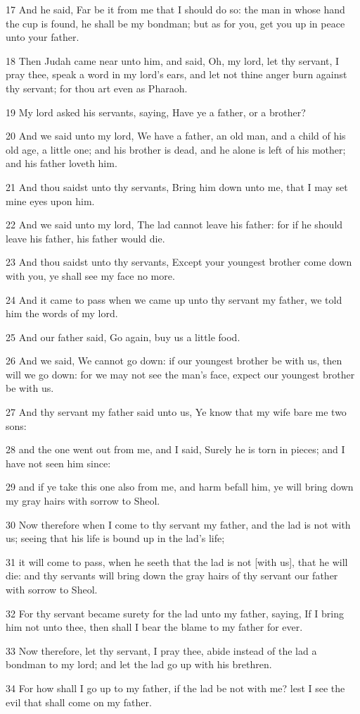 \par 17 And he said, Far be it from me that I should do so: the man in whose hand the cup is found, he shall be my bondman; but as for you, get you up in peace unto your father.
\par 18 Then Judah came near unto him, and said, Oh, my lord, let thy servant, I pray thee, speak a word in my lord's ears, and let not thine anger burn against thy servant; for thou art even as Pharaoh.
\par 19 My lord asked his servants, saying, Have ye a father, or a brother?
\par 20 And we said unto my lord, We have a father, an old man, and a child of his old age, a little one; and his brother is dead, and he alone is left of his mother; and his father loveth him.
\par 21 And thou saidst unto thy servants, Bring him down unto me, that I may set mine eyes upon him.
\par 22 And we said unto my lord, The lad cannot leave his father: for if he should leave his father, his father would die.
\par 23 And thou saidst unto thy servants, Except your youngest brother come down with you, ye shall see my face no more.
\par 24 And it came to pass when we came up unto thy servant my father, we told him the words of my lord.
\par 25 And our father said, Go again, buy us a little food.
\par 26 And we said, We cannot go down: if our youngest brother be with us, then will we go down: for we may not see the man's face, expect our youngest brother be with us.
\par 27 And thy servant my father said unto us, Ye know that my wife bare me two sons:
\par 28 and the one went out from me, and I said, Surely he is torn in pieces; and I have not seen him since:
\par 29 and if ye take this one also from me, and harm befall him, ye will bring down my gray hairs with sorrow to Sheol.
\par 30 Now therefore when I come to thy servant my father, and the lad is not with us; seeing that his life is bound up in the lad's life;
\par 31 it will come to pass, when he seeth that the lad is not [with us], that he will die: and thy servants will bring down the gray hairs of thy servant our father with sorrow to Sheol.
\par 32 For thy servant became surety for the lad unto my father, saying, If I bring him not unto thee, then shall I bear the blame to my father for ever.
\par 33 Now therefore, let thy servant, I pray thee, abide instead of the lad a bondman to my lord; and let the lad go up with his brethren.
\par 34 For how shall I go up to my father, if the lad be not with me? lest I see the evil that shall come on my father.

